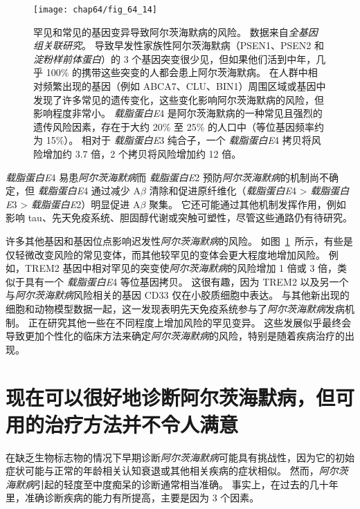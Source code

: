 \begin{figure}[htbp]
	\centering
	\texttt{[image: chap64/fig\_64\_14]}
	\caption{罕见和常见的基因变异导致阿尔茨海默病的风险。
		数据来自\textit{全基因组关联研究}。
		导致早发性家族性阿尔茨海默病（PSEN1、PSEN2 和 \textit{淀粉样前体蛋白}）的 3 个基因突变很少见，但如果他们活到中年，几乎 100\% 的携带这些突变的人都会患上阿尔茨海默病。
		在人群中相对频繁出现的基因（例如 ABCA7、CLU、BIN1）周围区域或基因中发现了许多常见的遗传变化，这些变化影响阿尔茨海默病的风险，但影响程度非常小。
		\textit{载脂蛋白E}4 是阿尔茨海默病的一种常见且强烈的遗传风险因素，存在于大约 20\% 至 25\% 的人口中（等位基因频率约为 15\%）。
		相对于 \textit{载脂蛋白E}3 纯合子，一个 \textit{载脂蛋白E}4 拷贝将风险增加约 3.7 倍，2 个拷贝将风险增加约 12 倍\cite{karch2015alzheimer}。}
	\label{fig:64_14}
\end{figure}


\textit{载脂蛋白E}4 易患\textit{阿尔茨海默病}而 \textit{载脂蛋白E}2 预防\textit{阿尔茨海默病}的机制尚不确定，但 \textit{载脂蛋白E}4 通过减少 A$\beta$ 清除和促进原纤维化（\textit{载脂蛋白E}4 > \textit{载脂蛋白E}3 > \textit{载脂蛋白E}2）明显促进 A$\beta$ 聚集。
它还可能通过其他机制发挥作用，例如影响 tau、先天免疫系统、胆固醇代谢或突触可塑性，尽管这些通路仍有待研究。


许多其他基因和基因位点影响迟发性\textit{阿尔茨海默病}的风险。
如图~\ref{fig:64_14}~所示，有些是仅轻微改变风险的常见变体，而其他较罕见的变体会更大程度地增加风险。
例如，TREM2 基因中相对罕见的突变使\textit{阿尔茨海默病}的风险增加 1 倍或 3 倍，类似于具有一个 \textit{载脂蛋白E}4 等位基因拷贝。
这很有趣，因为 TREM2 以及另一个与\textit{阿尔茨海默病}风险相关的基因 CD33 仅在小胶质细胞中表达。
与其他新出现的细胞和动物模型数据一起，这一发现表明先天免疫系统参与了\textit{阿尔茨海默病}发病机制。
正在研究其他一些在不同程度上增加风险的罕见变异。
这些发展似乎最终会导致更加个性化的临床方法来确定\textit{阿尔茨海默病}的风险，特别是随着疾病治疗的出现。



\section{现在可以很好地诊断阿尔茨海默病，但可用的治疗方法并不令人满意}

在缺乏生物标志物的情况下早期诊断\textit{阿尔茨海默病}可能具有挑战性，因为它的初始症状可能与正常的年龄相关认知衰退或其他相关疾病的症状相似。
然而，\textit{阿尔茨海默病}引起的轻度至中度痴呆的诊断通常相当准确。
事实上，在过去的几十年里，准确诊断疾病的能力有所提高，主要是因为 3 个因素。


